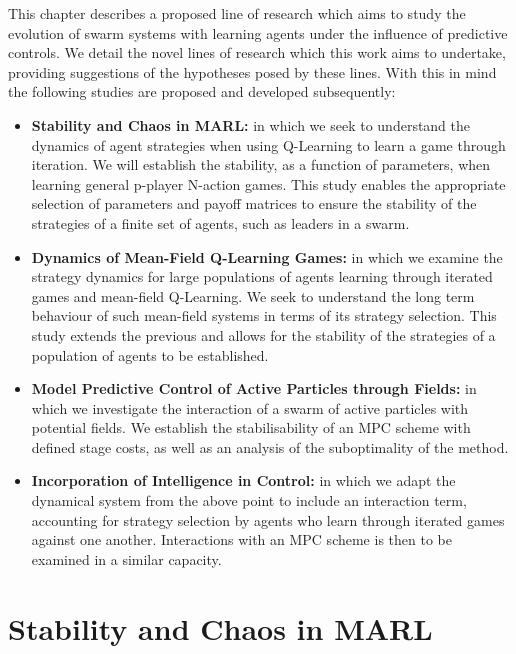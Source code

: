 \documentclass[.../main.tex]{subfiles}
\begin{document}
	This chapter describes a proposed line of research which aims to study the evolution of swarm
	systems with learning agents under the influence of predictive controls. We detail
	the novel lines of research which this work aims to undertake, providing suggestions of the
	hypotheses posed by these lines. With this in mind the following studies are proposed and
	developed subsequently:

	\begin{itemize}
		\item \textbf{Stability and Chaos in MARL:} in which we seek to understand the dynamics of
		agent strategies when using Q-Learning to learn a game through iteration. We will establish
		the stability, as a function of parameters, when learning general p-player N-action games.
		This study enables the appropriate selection of parameters and payoff matrices to ensure the
		stability of the strategies of a finite set of agents, such as leaders in a swarm.
		\item \textbf{Dynamics of Mean-Field Q-Learning Games:} in which we examine the
		strategy dynamics for large populations of agents learning through iterated games and
		mean-field Q-Learning. We seek to understand the long term behaviour of such mean-field
		systems in terms of its strategy selection. This study extends the previous and allows for
		the stability of the strategies of a population of agents to be established.
		\item \textbf{Model Predictive Control of Active Particles through Fields:} in which we
		investigate the interaction of a swarm of active particles with potential fields. We
		establish the stabilisability of an MPC scheme with defined stage costs, as well as an
		analysis of the suboptimality of the method.
		\item \textbf{Incorporation of Intelligence in Control:} in which we adapt the dynamical
		system from the above point to include an interaction term, accounting for strategy
		selection by agents who learn through iterated games against one another. Interactions with
		an MPC scheme is then to be examined in a similar capacity.

	\end{itemize}



    \section{Stability and Chaos in MARL} \label{sec::Chaos_in_MARL}
\end{document}
